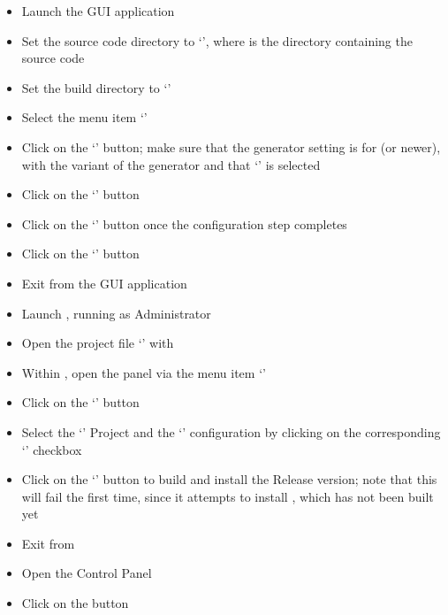 \begin{itemize}
\item Launch the  GUI application
\item\exSp{}Set the source code directory to
`', where 
is the directory containing the \mplusm{} source code
\item\exSp{}Set the build directory to
`'
\item\exSp{}Select the menu item `'
\item\exSp{}Click on the `' button; make sure that the generator
setting is for  (or newer), with the  variant of
the generator and that `' is selected
\item\exSp{}Click on the `' button
\item\exSp{}Click on the `' button once the configuration step
completes
\item\exSp{}Click on the `' button
\item\exSp{}Exit from the  GUI application
\item\exSp{}Launch , running as Administrator
\item\exSp{}Open the project file
`' with
\item\exSp{}Within , open the  panel via the
menu item `'
\item\exSp{}Click on the `' button
\item\exSp{}Select the `' Project and the `'
configuration by clicking on the corresponding `' checkbox
\item\exSp{}Click on the `' button to build and install the Release
version; note that this will fail the first time, since it attempts to install
\textit{\MMMU}, which has not been built yet
\item\exSp{}Exit from 
\item\exSp{}Open the  Control Panel
\item\exSp{}Click on the  button

\end{itemize}
